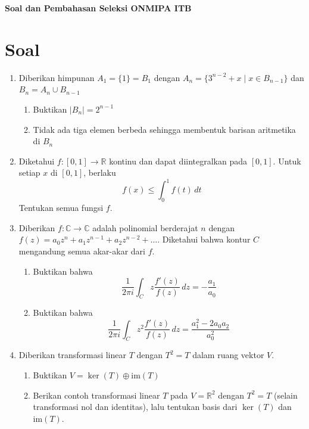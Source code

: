 \documentclass[11pt, a4paper]{article}
\begin{document}
\begin{center}
  \Large \textbf{Soal dan Pembahasan Seleksi ONMIPA ITB}
\end{center}
\vspace{0.5cm}

\section*{Soal}

\begin{enumerate}[leftmargin=*, label=\arabic*.]
  \item Diberikan himpunan $A_1 = \{1\} = B_1$ dengan
        $A_n = \{3^{n-2} + x \mid x \in B_{n-1}\}$ dan $B_n = A_n \cup B_{n-1}$
        \begin{enumerate}[label=(\alph*)]
          \item Buktikan $|B_n| = 2^{n-1}$
          \item Tidak ada tiga elemen berbeda sehingga membentuk barisan aritmetika di $B_n$
        \end{enumerate}

  \item Diketahui $f : [0, 1] \to \mathbb{R}$ kontinu dan dapat diintegralkan pada $[0, 1]$. Untuk setiap $x$ di $[0, 1]$, berlaku
        \[ f(x) \leq \int_0^1 f(t) \, dt \]
        Tentukan semua fungsi $f$.

  \item Diberikan $f : \mathbb{C} \to \mathbb{C}$ adalah polinomial berderajat $n$ dengan $f(z) = a_0z^n + a_1z^{n-1} + a_2z^{n-2} + \dots$. Diketahui bahwa kontur $C$ mengandung semua akar-akar dari $f$.
        \begin{enumerate}[label=(\alph*)]
          \item Buktikan bahwa
                \[ \frac{1}{2\pi i} \int_C z \frac{f'(z)}{f(z)} \, dz = -\frac{a_1}{a_0} \]
          \item Buktikan bahwa
                \[ \frac{1}{2\pi i} \int_C z^2 \frac{f'(z)}{f(z)} \, dz = \frac{a_1^2 - 2a_0a_2}{a_0^2} \]
        \end{enumerate}

  \item Diberikan transformasi linear $T$ dengan $T^2 = T$ dalam ruang vektor $V$.
        \begin{enumerate}[label=(\alph*)]
          \item Buktikan $V = \ker(T) \oplus \text{im}(T)$
          \item Berikan contoh transformasi linear $T$ pada $V = \mathbb{R}^2$ dengan $T^2 = T$ (selain transformasi nol dan identitas), lalu tentukan basis dari $\ker(T)$ dan $\text{im}(T)$.
        \end{enumerate}


\end{enumerate}
\end{document}
